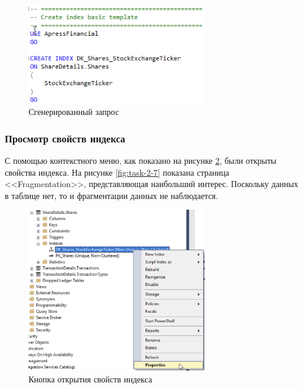 \documentclass[a4paper, 14pt]{extarticle}
\begin{document}
\begin{figure}[H]
  \centering
  \includegraphics[width=0.7\textwidth]{images/task-2/5.png}
  \caption{Сгенерированный запрос}
  \label{fig:task-2-5}
\end{figure}

\subsubsection{Просмотр свойств индекса}

С помощью контекстного меню, как показано на рисунке \ref{fig:task-2-6}, были
открыты свойства индекса. На рисунке \ref{fig:task-2-7} показана страница
<<\foreignlanguage{english}{Fragmentation}>>, представляющая наибольший интерес.
Поскольку данных в таблице нет, то и фрагментации данных не наблюдается.

\begin{figure}[H]
  \centering
  \includegraphics[width=0.7\textwidth]{images/task-2/6.png}
  \caption{Кнопка открытия свойств индекса}
  \label{fig:task-2-6}
\end{figure}
\end{document}
